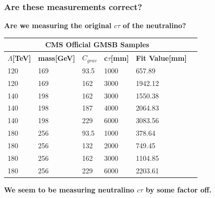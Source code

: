 \documentclass{beamer}
\begin{document}
\begin{frame}  %
    \frametitle{Are these measurements correct?}
  \begin{LARGE}  
  \textbf{Are we measuring the original $c\tau$  of the neutralino?}
    \end{LARGE}
    \vspace{-0.5cm}
\begin{table}
\begin{minipage}[b]{1.0\linewidth}
\centering
\begin{tabular}{|l||l||l||l|l|l|}
  \hline
  \multicolumn{5}{|c|}{\bfseries{CMS Official GMSB Samples}} \\
  \hline 
  \bfseries{$\Lambda$[TeV]} &  \bfseries{mass[GeV]} & \bfseries{$C_{grav}$} & \bfseries{c$\tau$[mm]} & \bfseries{Fit Value[mm]} \\
\hline  
120 & 169  & 93.5 & 1000 & 657.89 \\
120 & 169 & 162 & 3000  &1942.12 \\
\hline 
\hline
140 & 198 & 162 & 3000 & 1550.38 \\
140 & 198 & 187 & 4000 & 2064.83 \\
140 & 198 & 229 & 6000 & 3083.56 \\
\hline
\hline
180  & 256 & 93.5 & 1000 & 378.64 \\
180  & 256 & 132  & 2000 & 749.45 \\
180  & 256 & 162  & 3000 & 1104.85 \\
180 & 256 & 229 & 6000 & 2203.61 \\
\hline
  \end{tabular}
  \end{minipage}
\end{table}
\vspace{-0.5cm}
 \alert{\textbf{We seem to be measuring neutralino $c\tau$ by some factor off.}}
 
\end{frame}
\end{document}
